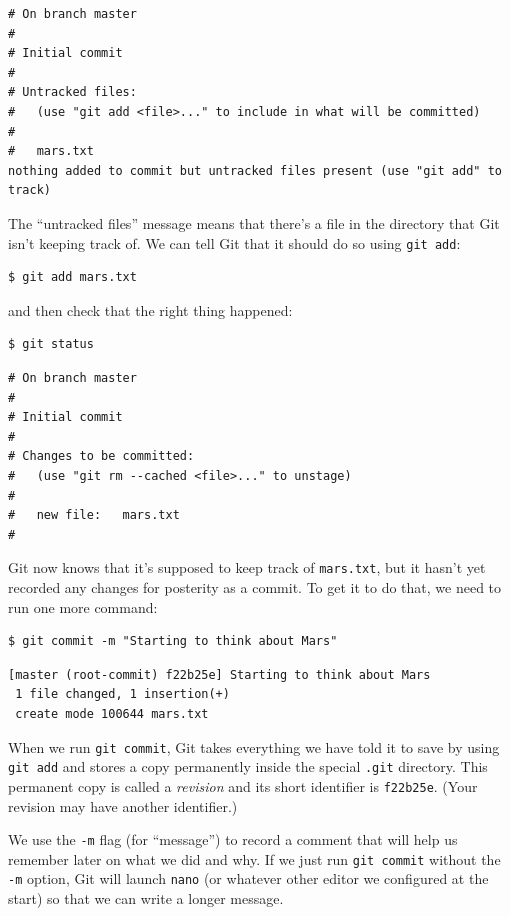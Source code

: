 \documentclass[]{book}
\newcommand{\gdef}[2]{\emph{#2}}
\begin{document}
\begin{verbatim}
# On branch master
#
# Initial commit
#
# Untracked files:
#   (use "git add <file>..." to include in what will be committed)
#
#   mars.txt
nothing added to commit but untracked files present (use "git add" to track)
\end{verbatim}

The ``untracked files'' message means that there's a file in the
directory that Git isn't keeping track of. We can tell Git that it
should do so using \texttt{git add}:

\begin{verbatim}
$ git add mars.txt
\end{verbatim}

and then check that the right thing happened:

\begin{verbatim}
$ git status
\end{verbatim}

\begin{verbatim}
# On branch master
#
# Initial commit
#
# Changes to be committed:
#   (use "git rm --cached <file>..." to unstage)
#
#   new file:   mars.txt
#
\end{verbatim}

Git now knows that it's supposed to keep track of \texttt{mars.txt}, but
it hasn't yet recorded any changes for posterity as a commit. To get it
to do that, we need to run one more command:

\begin{verbatim}
$ git commit -m "Starting to think about Mars"
\end{verbatim}

\begin{verbatim}
[master (root-commit) f22b25e] Starting to think about Mars
 1 file changed, 1 insertion(+)
 create mode 100644 mars.txt
\end{verbatim}

When we run \texttt{git commit}, Git takes everything we have told it to
save by using \texttt{git add} and stores a copy permanently inside the
special \texttt{.git} directory. This permanent copy is called a
\gdef{g:revision}{revision} and its short identifier is
\texttt{f22b25e}. (Your revision may have another identifier.)

We use the \texttt{-m} flag (for ``message'') to record a comment that
will help us remember later on what we did and why. If we just run
\texttt{git commit} without the \texttt{-m} option, Git will launch
\texttt{nano} (or whatever other editor we configured at the start) so
that we can write a longer message.
\end{document}

